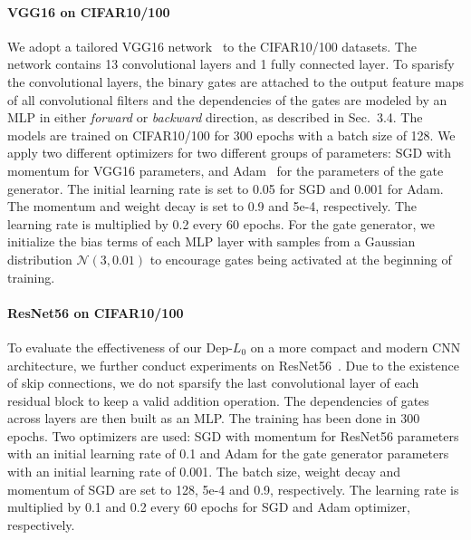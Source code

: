 \documentclass[runningheads, envcountsame, a4paper]{llncs}
\begin{document}
\paragraph{VGG16 on CIFAR10/100}
We adopt a tailored VGG16 network~\cite{liu2015very} to the CIFAR10/100 datasets. The network contains 13 convolutional layers and 1 fully connected layer. To sparisfy the convolutional layers, the binary gates are attached to the output feature maps of all convolutional filters and the dependencies of the gates are modeled by an MLP in either \textit{forward} or \textit{backward} direction, as described in Sec.~3.4. The models are trained on CIFAR10/100 for 300 epochs with a batch size of 128. We apply two different optimizers for two different groups of parameters: SGD with momentum for VGG16 parameters, and Adam~\cite{kingma2014adam} for the parameters of the gate generator. The initial learning rate is set to 0.05 for SGD and 0.001 for Adam. The momentum and weight decay is set to 0.9 and 5e-4, respectively. The learning rate is multiplied by 0.2 every 60 epochs. For the gate generator, we initialize the bias terms of each MLP layer with samples from a Gaussian distribution $\mathcal{N}(3, 0.01)$ to encourage gates being activated at the beginning of training.


\paragraph{ResNet56 on CIFAR10/100}
To evaluate the effectiveness of our Dep-$L_0$ on a more compact and modern CNN architecture, we further conduct experiments on ResNet56~\cite{he2016deep}. Due to the existence of skip connections, we do not sparsify the last convolutional layer of each residual block to keep a valid addition operation. The dependencies of gates across layers are then built as an MLP. The training has been done in 300 epochs. Two optimizers are used: SGD with momentum for ResNet56 parameters with an initial learning rate of 0.1 and Adam for the gate generator parameters with an initial learning rate of 0.001. The batch size, weight decay and momentum of SGD are set to 128, 5e-4 and 0.9, respectively. The learning rate is multiplied by 0.1 and 0.2 every 60 epochs for SGD and Adam optimizer, respectively. 
\end{document}
